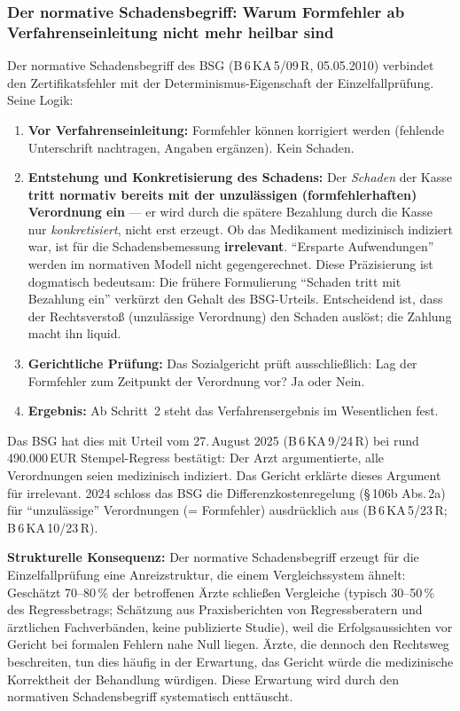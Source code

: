 \documentclass{umbruch-position}
\begin{document}
\subsubsection{Der normative Schadensbegriff: Warum Formfehler ab Verfahrenseinleitung nicht mehr heilbar sind}
\label{sec:normativer-schaden}

Der normative Schadensbegriff des BSG (B\,6\,KA\,5/09\,R, 05.05.2010) verbindet den Zertifikatsfehler mit der Determinismus-Eigenschaft der Einzelfallprüfung. Seine Logik:

\begin{enumerate}[nosep]
  \item \textbf{Vor Verfahrenseinleitung:} Formfehler können korrigiert werden (fehlende Unterschrift nachtragen, Angaben ergänzen). Kein Schaden.
  \item \textbf{Entstehung und Konkretisierung des Schadens:} Der \emph{Schaden} der Kasse \textbf{tritt normativ bereits mit der unzulässigen (formfehlerhaften) Verordnung ein} --- er wird durch die spätere Bezahlung durch die Kasse nur \emph{konkretisiert}, nicht erst erzeugt. Ob das Medikament medizinisch indiziert war, ist für die Schadens\-bemessung \textbf{irrelevant}. ``Ersparte Aufwendungen'' werden im normativen Modell nicht gegengerechnet. Diese Präzisierung ist dogmatisch bedeutsam: Die frühere Formulierung ``Schaden tritt mit Bezahlung ein'' verkürzt den Gehalt des BSG-Urteils. Entscheidend ist, dass der Rechtsverstoß (unzulässige Verordnung) den Schaden auslöst; die Zahlung macht ihn liquid.
  \item \textbf{Gerichtliche Prüfung:} Das Sozialgericht prüft ausschließlich: Lag der Formfehler zum Zeitpunkt der Verordnung vor? Ja oder Nein.
  \item \textbf{Ergebnis:} Ab Schritt~2 steht das Verfahrensergebnis im Wesentlichen fest.
\end{enumerate}

Das BSG hat dies mit Urteil vom 27.\,August 2025 (B\,6\,KA\,9/24\,R) bei rund 490.000\,EUR Stempel-Regress bestätigt: Der Arzt argumentierte, alle Verordnungen seien medizinisch indiziert. Das Gericht erklärte dieses Argument für irrelevant. 2024 schloss das BSG die Differenzkostenregelung (\S\,106b Abs.\,2a) für ``unzulässige'' Verordnungen (= Formfehler) ausdrücklich aus (B\,6\,KA\,5/23\,R; B\,6\,KA\,10/23\,R).

\textbf{Strukturelle Konsequenz:} Der normative Schadensbegriff erzeugt für die Einzelfallprüfung eine Anreizstruktur, die einem Vergleichssystem ähnelt: Geschätzt 70--80\,\% der betroffenen Ärzte schließen Vergleiche (typisch 30--50\,\% des Regressbetrags; Schätzung aus Praxisberichten von Regressberatern und ärztlichen Fachverbänden, keine publizierte Studie), weil die Erfolgsaussichten vor Gericht bei formalen Fehlern nahe Null liegen. Ärzte, die dennoch den Rechtsweg beschreiten, tun dies häufig in der Erwartung, das Gericht würde die medizinische Korrektheit der Behandlung würdigen. Diese Erwartung wird durch den normativen Schadensbegriff systematisch enttäuscht.
\end{document}
